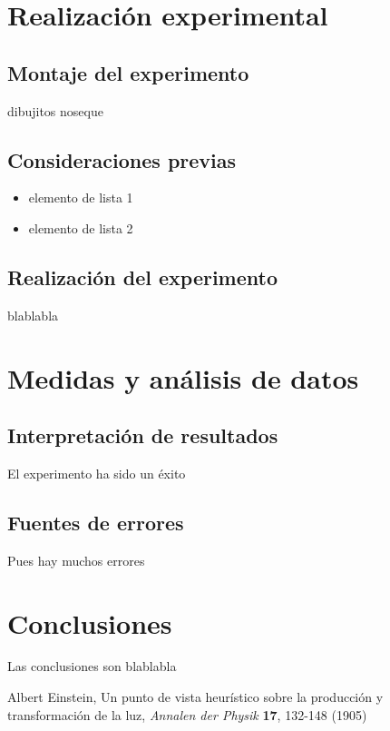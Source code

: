 \documentclass[12pt,a4paper]{article}
\begin{document}
\begin{multicols}{2}
\section{Realización experimental}
\subsection{Montaje del experimento}
dibujitos noseque

\subsection{Consideraciones previas}
\label{consideraciones}
\begin{itemize}
\item elemento de lista 1
\item elemento de lista 2
\end{itemize}

\subsection{Realización del experimento}
blablabla
\section{Medidas y análisis de datos}
\subsection{Interpretación de resultados}
El experimento ha sido un éxito
\subsection{Fuentes de errores}
Pues hay muchos errores

\end{multicols} %
\section{Conclusiones}
Las conclusiones son blablabla

\newpage
\begin{thebibliography}{99} %
 Albert Einstein, Un punto de vista heurístico sobre la producción y transformación de la luz, \textit{Annalen der Physik} \textbf{17}, 132-148 (1905)
\end{thebibliography}
\end{document}
